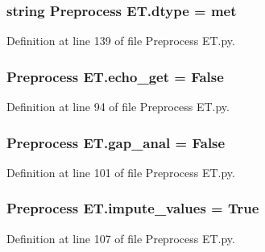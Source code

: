 \subsubsection[{dtype}]{\setlength{\rightskip}{0pt plus 5cm}string Preprocess E\+T.\+dtype = \textquotesingle{}met\textquotesingle{}}\label{namespace_preprocess_01_e_t_a9cd560dc1db09793df2f3871b8831ed9}


Definition at line 139 of file Preprocess E\+T.\+py.

\hypertarget{namespace_preprocess_01_e_t_adfbac2f19a9ab903cc0b66cc8fa19895}{}
\subsubsection[{echo\+\_\+get}]{\setlength{\rightskip}{0pt plus 5cm}Preprocess E\+T.\+echo\+\_\+get = False}\label{namespace_preprocess_01_e_t_adfbac2f19a9ab903cc0b66cc8fa19895}


Definition at line 94 of file Preprocess E\+T.\+py.

\hypertarget{namespace_preprocess_01_e_t_aede28f77ad85357828b0b3698edc08d9}{}
\subsubsection[{gap\+\_\+anal}]{\setlength{\rightskip}{0pt plus 5cm}Preprocess E\+T.\+gap\+\_\+anal = False}\label{namespace_preprocess_01_e_t_aede28f77ad85357828b0b3698edc08d9}


Definition at line 101 of file Preprocess E\+T.\+py.

\hypertarget{namespace_preprocess_01_e_t_ab1c6d2c68092605d890b308dd6ae63cf}{}
\subsubsection[{impute\+\_\+values}]{\setlength{\rightskip}{0pt plus 5cm}Preprocess E\+T.\+impute\+\_\+values = True}\label{namespace_preprocess_01_e_t_ab1c6d2c68092605d890b308dd6ae63cf}


Definition at line 107 of file Preprocess E\+T.\+py.

